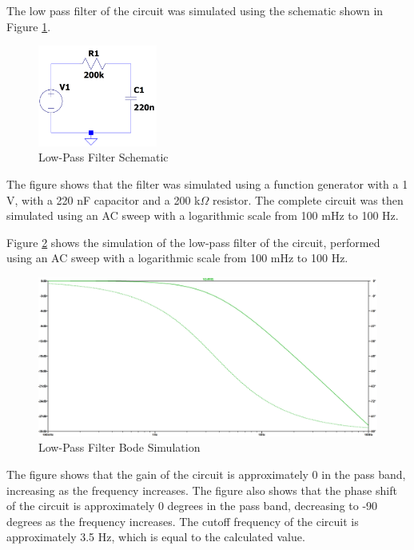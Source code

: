 \documentclass[CMPE]{KGCOEReport}
\begin{document}
The low pass filter of the circuit was simulated using the schematic shown in Figure \ref{fig:ltspiceLowPassSchematic}.

\begin{figure}[H]
    \centering
    \includegraphics[width=0.35\textwidth]{LowPass.png}
    \caption{Low-Pass Filter Schematic}
    \label{fig:ltspiceLowPassSchematic}
\end{figure}

The figure shows that the filter was simulated using a function generator with a 1 V, with a 220 nF capacitor and a 200 k$\Omega$ resistor. The complete circuit was then simulated using an AC sweep with a logarithmic scale from 100 mHz to 100 Hz.

Figure \ref{fig:lowPassSim} shows the simulation of the low-pass filter of the circuit, performed using an AC sweep with a logarithmic scale from 100 mHz to 100 Hz.

\begin{figure}[H]
    \centering
    \includegraphics[width=1\textwidth]{SimFreqLowPass.png}
    \caption{Low-Pass Filter Bode Simulation}
    \label{fig:lowPassSim}
\end{figure}

The figure shows that the gain of the circuit is approximately 0 in the pass band, increasing as the frequency increases. The figure also shows that the phase shift of the circuit is approximately 0 degrees in the pass band, decreasing to -90 degrees as the frequency increases. The cutoff frequency of the circuit is approximately 3.5 Hz, which is equal to the calculated value.
\end{document}
